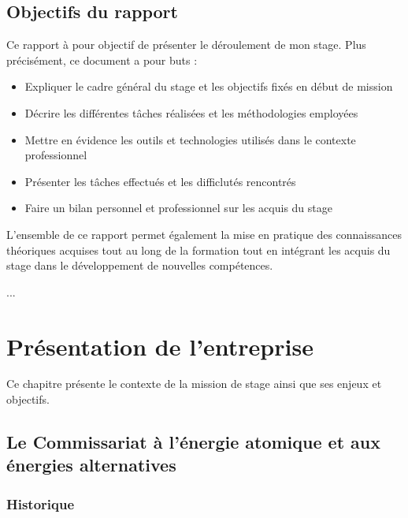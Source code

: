 \documentclass[12pt,a4paper]{report}
\begin{document}
\section{Objectifs du rapport}
Ce rapport à pour objectif de présenter le déroulement de mon stage. Plus précisément, ce document a pour buts :
\begin{itemize}
  \item Expliquer le cadre général du stage et les objectifs fixés en début de mission
  \item Décrire les différentes tâches réalisées et les méthodologies employées
  \item Mettre en évidence les outils et technologies utilisés dans le contexte professionnel
  \item Présenter les tâches effectués et les difficlutés rencontrés
  \item Faire un bilan personnel et professionnel sur les acquis du stage
\end{itemize}

L'ensemble de ce rapport permet également la mise en pratique des connaissances théoriques acquises tout au long de la formation tout en intégrant les acquis du stage dans le développement de nouvelles compétences.

... %

\chapter{Présentation de l'entreprise}

Ce chapitre présente le contexte de la mission de stage ainsi que ses enjeux et objectifs.

\section{Le Commissariat à l'énergie atomique et aux énergies alternatives}
\subsection{Historique}
\end{document}
